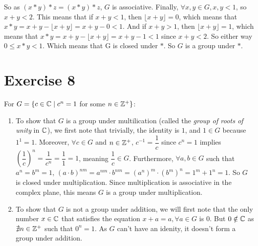 \documentclass[12pt]{article}
\begin{document}
    So as $(x \ast y) \ast z = (x \ast y) \ast z$,
    $G$ is associative.
    Finally, $\forall x, y \in G, x, y < 1$,
    so $x + y < 2$.
    This means that if $x + y < 1$,
    then  $\lfloor x + y \rfloor = 0$,
    which means that $x \ast y = x + y - \lfloor x + y \rfloor = x + y - 0 < 1$.
    And if $x + y > 1$,
    then $\lfloor x + y \rfloor = 1$,
    which means that $x \ast y = x + y - \lfloor x + y \rfloor = x + y - 1 < 1$
    since $x + y < 2$.
    So either way $0 \leqslant x \ast y < 1$.
    Which means that G is closed under $\ast$.
    So $G$ is a group under $\ast$.

    
    \section*{Exercise 8}
    For $G = \{c \in \mathbb{C} \mid c^{n} = 1$ for some $n \in \mathbb{Z}^{+}\}$:
    \begin{enumerate}[label=\textbf{\alph*.}]
        \item 
            To show that $G$ is a group under multilication
            (called the \textit{group of roots of unity} in $\mathbb{C}$),
            we first note that trivially, the identity is $1$,
            and $1 \in G$ because $1^{1} = 1$.
            Moreover, $\forall c \in G$ and $n \in \mathbb{Z}^{+}$,
            $c^{-1} = \dfrac{1}{c}$
            since $c^{n} = 1$
            implies $(\dfrac{1}{c})^{n} = \dfrac{1}{c^{n}} = \dfrac{1}{1} = 1$,
            meaning $\dfrac{1}{c} \in G$.
            Furthermore, $\forall a, b \in G$
            such that $a^{n} = b^{m} = 1$,
            $(a \cdot b)^{nm}
            = a^{nm} \cdot b^{nm}
            = (a^{n})^{m} \cdot (b^{m})^{n}
            = 1^{m} + 1^{n}
            = 1$.
            So $G$ is closed under multiplication.
            Since multiplication is associative in the complex plane,
            this means $G$ is a group under multiplication.
        \item 
            To show that $G$ is not a group under addition,
            we will first note that the only number $x \in \mathbb{C}$
            that satisfies the equation $x + a = a, \forall a \in G$ is $0$.
            But $0 \notin \mathbb{C}$
            as $\nexists n \in \mathbb{Z}^{+}$
            such that $0^n = 1$.
            As $G$ can't have an idenity,
            it doesn't form a group under addition. 
    \end{enumerate}
\end{document}
